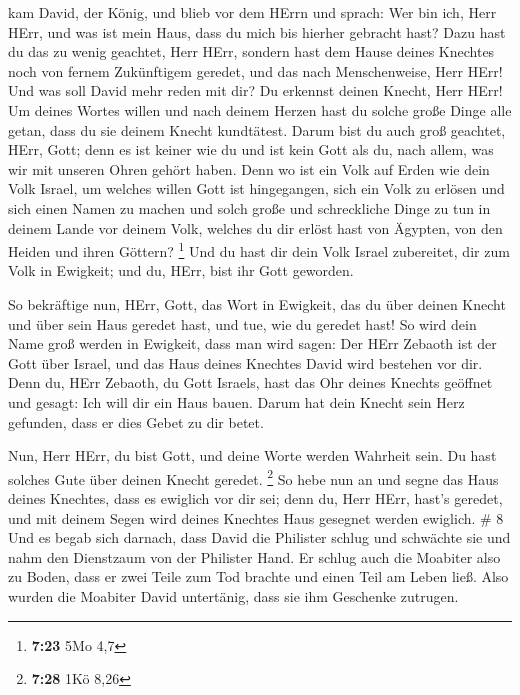  kam David, der König, und blieb vor dem HErrn und sprach:
Wer bin ich, Herr HErr, und was ist mein Haus, dass du mich bis hierher
gebracht hast?  Dazu hast du das zu wenig geachtet, Herr
HErr, sondern hast dem Hause deines Knechtes noch von fernem Zukünftigem
geredet, und das nach Menschenweise, Herr HErr!  Und was
soll David mehr reden mit dir? Du erkennst deinen Knecht, Herr HErr!
 Um deines Wortes willen und nach deinem Herzen hast du
solche große Dinge alle getan, dass du sie deinem Knecht kundtätest.
 Darum bist du auch groß geachtet, HErr, Gott; denn es ist
keiner wie du und ist kein Gott als du, nach allem, was wir mit unseren
Ohren gehört haben.  Denn wo ist ein Volk auf Erden wie
dein Volk Israel, um welches willen Gott ist hingegangen, sich ein Volk
zu erlösen und sich einen Namen zu machen und solch große und
schreckliche Dinge zu tun in deinem Lande vor deinem Volk, welches du
dir erlöst hast von Ägypten, von den Heiden und ihren Göttern?
\footnote{\textbf{7:23} 5Mo 4,7}  Und du hast dir dein Volk
Israel zubereitet, dir zum Volk in Ewigkeit; und du, HErr, bist ihr Gott
geworden.

 So bekräftige nun, HErr, Gott, das Wort in Ewigkeit, das
du über deinen Knecht und über sein Haus geredet hast, und tue, wie du
geredet hast!  So wird dein Name groß werden in Ewigkeit,
dass man wird sagen: Der HErr Zebaoth ist der Gott über Israel, und das
Haus deines Knechtes David wird bestehen vor dir.  Denn du,
HErr Zebaoth, du Gott Israels, hast das Ohr deines Knechts geöffnet und
gesagt: Ich will dir ein Haus bauen. Darum hat dein Knecht sein Herz
gefunden, dass er dies Gebet zu dir betet.

 Nun, Herr HErr, du bist Gott, und deine Worte werden
Wahrheit sein. Du hast solches Gute über deinen Knecht geredet.
\footnote{\textbf{7:28} 1Kö 8,26}  So hebe nun an und segne
das Haus deines Knechtes, dass es ewiglich vor dir sei; denn du, Herr
HErr, hast's geredet, und mit deinem Segen wird deines Knechtes Haus
gesegnet werden ewiglich. \# 8  Und es begab sich darnach,
dass David die Philister schlug und schwächte sie und nahm den
Dienstzaum von der Philister Hand.  Er schlug auch die
Moabiter also zu Boden, dass er zwei Teile zum Tod brachte und einen
Teil am Leben ließ. Also wurden die Moabiter David untertänig, dass sie
ihm Geschenke zutrugen.

